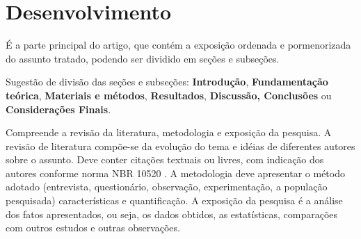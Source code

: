 \section{Desenvolvimento}

É a parte principal do artigo, que contém a exposição ordenada e pormenorizada do assunto tratado, podendo ser dividido em seções e subseções.

Sugestão de divisão das seções e subseções: \textbf{Introdução}, \textbf{Fundamentação teórica}, \textbf{Materiais e métodos}, \textbf{Resultados}, \textbf{Discussão, Conclusões} ou \textbf{Considerações Finais}.

Compreende a revisão da literatura, metodologia e exposição da pesquisa. A revisão de literatura compõe-se da evolução do tema e idéias de diferentes autores sobre o assunto. Deve conter citações textuais ou livres, com indicação dos autores conforme norma NBR 10520 \cite{NBR10520:2002}. A metodologia deve apresentar o método adotado (entrevista, questionário, observação, experimentação, a população pesquisada) características e quantificação. A exposição da pesquisa é a análise dos fatos apresentados, ou seja, os dados obtidos, as estatísticas, comparações com outros estudos e outras observações. 
